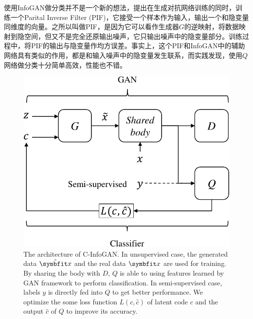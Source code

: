 使用InfoGAN做分类并不是一个新的想法，\citet{zhang2018cramer}提出在生成对抗网络训练的同时，训练一个Parital Inverse Filter (PIF)，它接受一个样本作为输入，输出一个和隐变量同维度的向量。之所以叫做PIF，是因为它可以看作生成器$G$的逆映射，将数据映射到隐空间，但又不是完全还原输出噪声，它只输出噪声中的隐变量部分。训练过程中，将PIF的输出与隐变量作均方误差。事实上，这个PIF和InfoGAN中的辅助网络具有类似的作用，都是和输入噪声中的隐变量发生联系，而实践发现，使用$Q$网络做分类十分简单高效，性能也不错。

\begin{figure}[htbp]
  \centering
  \includegraphics[scale=0.7]{Img/arch-cinfogan.pdf} 
  {The architecture of C-InfoGAN. In unsupervised case, the generated data $\tilde{\bd{x}}$ and the real data $\bd{x}$ are used for training. By sharing the body with $D$, $Q$ is able to using features learned by GAN framework to perform classification. In semi-supervised case, labels $y$ is directly fed into $Q$ to get better performance. We optimize the some loss function $L(c, \hat{c})$ of latent code $c$ and the output $\hat{c}$ of $Q$ to improve its accuracy.}
  \label{fig:c-infogan}
\end{figure}

